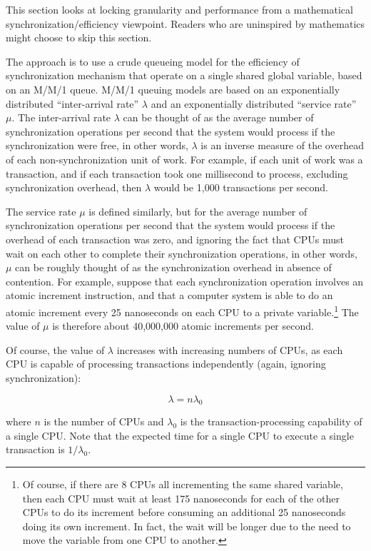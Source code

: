This section looks at locking granularity and performance from
a mathematical synchronization\-/efficiency viewpoint.
Readers who are uninspired by mathematics might choose to skip
this section.

The approach is to use a crude queueing model for the efficiency of
synchronization mechanism that operate on a single shared global
variable, based on an M/M/1 queue.
M/M/1 queuing models are based on an exponentially distributed
``inter-arrival rate'' $\lambda$ and an exponentially distributed
``service rate'' $\mu$.
The inter-arrival rate $\lambda$ can be thought of as the average
number of synchronization operations per second that the system
would process if the synchronization were free, in other words,
$\lambda$ is an inverse measure of the overhead of each non-synchronization
unit of work.
For example, if each unit of work was a transaction, and if each transaction
took one millisecond to process, excluding synchronization overhead,
then $\lambda$ would be 1,000 transactions per second.

The service rate $\mu$ is defined similarly, but for the average
number of synchronization operations per second that the system
would process if the overhead of each transaction was zero, and
ignoring the fact that CPUs must wait on each other to complete
their synchronization operations, in other words, $\mu$ can be roughly
thought of as the synchronization overhead in absence of contention.
For example, suppose that each synchronization operation involves an atomic
increment instruction, and that a computer system is able to do
an atomic increment every 25 nanoseconds on each CPU
to a private variable.\footnote{
	Of course, if there are 8 CPUs all incrementing the same
	shared variable, then each CPU must wait at least 175 nanoseconds
	for each of the other CPUs to do its increment before consuming
	an additional 25 nanoseconds doing its own increment.
	In fact, the wait will be longer due to the need
	to move the variable from one CPU to another.}
The value of $\mu$ is therefore about 40,000,000 atomic increments
per second.

Of course, the value of $\lambda$ increases with increasing numbers of
CPUs, as each CPU is capable of processing transactions independently
(again, ignoring synchronization):

\begin{equation}
	\lambda = n \lambda_0
\end{equation}

where $n$ is the number of CPUs and $\lambda_0$ is the transaction-processing
capability of a single CPU.
Note that the expected time for a single CPU to execute a single transaction
is $1 / \lambda_0$.

